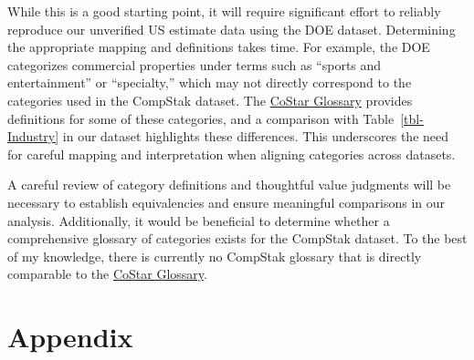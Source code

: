\documentclass[
  12pt]{article}
\begin{document}
While this is a good starting point, it will require significant effort
to reliably reproduce our unverified US estimate data using the DOE
dataset. Determining the appropriate mapping and definitions takes time.
For example, the DOE categorizes commercial properties under terms such
as ``sports and entertainment'' or ``specialty,'' which may not directly
correspond to the categories used in the CompStak dataset. The
\href{https://www.costar.com/about/costar-glossary}{CoStar Glossary}
provides definitions for some of these categories, and a comparison with
Table~\ref{tbl-Industry} in our dataset highlights these differences.
This underscores the need for careful mapping and interpretation when
aligning categories across datasets.

A careful review of category definitions and thoughtful value judgments
will be necessary to establish equivalencies and ensure meaningful
comparisons in our analysis. Additionally, it would be beneficial to
determine whether a comprehensive glossary of categories exists for the
CompStak dataset. To the best of my knowledge, there is currently no
CompStak glossary that is directly comparable to the
\href{https://www.costar.com/about/costar-glossary}{CoStar Glossary}.

\section{Appendix}\label{appendix}

\begin{figure}


\caption{\label{fig-prop2}}

\end{figure}%
\end{document}
